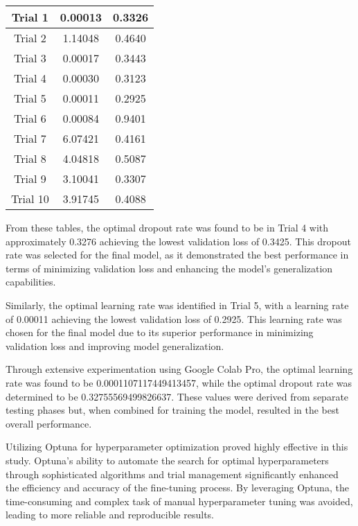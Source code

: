 \begin{table}[H]
\begin{minipage}{0.45\textwidth}
\begin{longtable}{|c|c|c|}
      \endfoot
      \hline
      \endlastfoot
      Trial 1 & 0.00013 & 0.3326 \\
      \hline
      Trial 2 & 1.14048 & 0.4640 \\
      \hline
      Trial 3 & 0.00017 & 0.3443 \\
      \hline
      Trial 4 & 0.00030 & 0.3123 \\
      \hline
      Trial 5 & 0.00011 & 0.2925 \\
      \hline
      Trial 6 & 0.00084 & 0.9401 \\
      \hline
      Trial 7 & 6.07421 & 0.4161 \\
      \hline
      Trial 8 & 4.04818 & 0.5087 \\
      \hline
      Trial 9 & 3.10041 & 0.3307 \\
      \hline
      Trial 10 & 3.91745 & 0.4088 \\
      \hline
    \end{longtable}
  \end{minipage}
\end{table}


From these tables, the optimal dropout rate was found to be in Trial 4 with approximately 0.3276 achieving the lowest validation loss of 0.3425. This dropout rate was selected for the final model, as it demonstrated the best performance in terms of minimizing validation loss and enhancing the model's generalization capabilities.

Similarly, the optimal learning rate was identified in Trial 5, with a learning rate of 0.00011 achieving the lowest validation loss of 0.2925. This learning rate was chosen for the final model due to its superior performance in minimizing validation loss and improving model generalization.

Through extensive experimentation using Google Colab Pro, the optimal learning rate was found to be 0.0001107117449413457, while the optimal dropout rate was determined to be 0.32755569499826637. These values were derived from separate testing phases but, when combined for training the model, resulted in the best overall performance.

Utilizing Optuna for hyperparameter optimization proved highly effective in this study. Optuna's ability to automate the search for optimal hyperparameters through sophisticated algorithms and trial management significantly enhanced the efficiency and accuracy of the fine-tuning process. By leveraging Optuna, the time-consuming and complex task of manual hyperparameter tuning was avoided, leading to more reliable and reproducible results.


